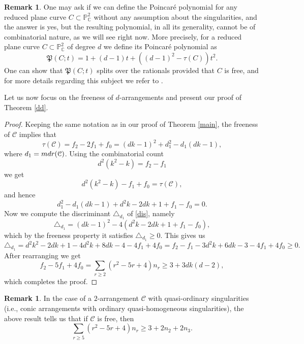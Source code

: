 \documentclass[12pt]{article}
\theoremstyle{plain}
\theoremstyle{definition}
\newtheorem{remark}[thm]{Remark}
\begin{document}
\begin{remark}
One may ask if we can define the Poincar\'e polynomial for any reduced plane curve $C \subset \mathbb{P}^{2}_{\mathbb{C}}$ without any assumption about the singularities, and the answer is yes, but the resulting polynomial, in all its generality, cannot be of combinatorial nature, as we will see right now. More precisely, for a reduced plane curve $C \subset \mathbb{P}^{2}_{\mathbb{C}}$ of degree $d$ we define its Poincar\'e polynomial as
\begin{equation}
\mathfrak{P}(C;t) =1 + (d-1)t + ((d-1)^{2} - \tau(C))t^{2}.    
\end{equation}
One can show that $\mathfrak{P}(C;t)$ splits over the rationals provided that $C$ is free, and for more details regarding this subject we refer to \cite{DIMCC}. 
\end{remark}

Let us now focus on the freeness of $d$-arrangements and present our proof of Theorem \ref{dd}.
\begin{proof}
Keeping the same notation as in our proof of Theorem \ref{main}, the freeness of $\mathcal{C}$ implies that
$$\tau(\mathcal{C}) = f_{2}-2f_{1}+f_{0} = (dk-1)^{2} + d_{1}^{2} -d_{1}(dk-1),$$
where $d_{1} = {\rm mdr}(\mathcal{C})$.
Using the combinatorial count
$$d^{2}(k^{2}-k) = f_{2} - f_{1}$$
we get
$$d^{2}(k^{2}-k) - f_{1} + f_{0} = \tau(\mathcal{C}),$$
and hence
\begin{equation}
\label{dis}
d_{1}^{2} - d_{1}(dk-1) +d^{2}k - 2dk+1  + f_{1} - f_{0} = 0.
\end{equation}
Now we compute the discriminant $\triangle_{d_{1}}$ of \eqref{dis}, namely
$$\triangle_{d_{1}} = (dk-1)^2 - 4(d^{2}k-2dk+1 + f_{1}-f_{0}),$$
which by the freeness property it satisfies $\triangle_{d_{1}} \geq 0$.
This gives us
$$\triangle_{d_{1}} = d^{2}k^{2}-2dk + 1 - 4d^{2}k + 8dk - 4 -4f_{1}+4f_{0} = f_{2} - f_{1} -3d^{2}k+6dk -3 -4f_{1}+4f_{0} \geq 0.$$
After rearranging we get
$$f_{2} -5f_{1} + 4f_{0} = \sum_{r\geq 2}(r^{2}-5r + 4)n_{r} \geq 3 + 3dk(d-2),$$
which completes the proof.
\end{proof}
\begin{remark}
In the case of a $2$-arrangement $\mathcal{C}$ with quasi-ordinary singularities (i.e., conic arrangements with ordinary quasi-homogeneous singularities), the above result tells us that if $\mathcal{C}$ is free, then
$$\sum_{r\geq 5} (r^{2}-5r+4)n_{r} \geq 3 + 2n_{2} + 2n_{3}.$$
\end{remark}
\end{document}
